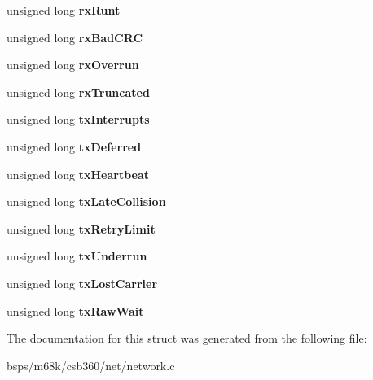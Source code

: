 \begin{DoxyCompactItemize}
unsigned long {\bfseries rx\+Runt}
\item 
\mbox{\label{structmcf5272__enet__struct_af6495160f0e4f48ba11eeb175e3903ad}} 
unsigned long {\bfseries rx\+Bad\+C\+RC}
\item 
\mbox{\label{structmcf5272__enet__struct_ac1e9f1dff85f63d8b0e8ae58a9b5f26c}} 
unsigned long {\bfseries rx\+Overrun}
\item 
\mbox{\label{structmcf5272__enet__struct_a6148a0d2e2bf0a9ecab4162e023cb716}} 
unsigned long {\bfseries rx\+Truncated}
\item 
\mbox{\label{structmcf5272__enet__struct_abbe9c5e93bb79d30a230dab62d350405}} 
unsigned long {\bfseries tx\+Interrupts}
\item 
\mbox{\label{structmcf5272__enet__struct_a08d0eae6b948e25a70125f64b32f203e}} 
unsigned long {\bfseries tx\+Deferred}
\item 
\mbox{\label{structmcf5272__enet__struct_aaf2ae753f3d40e3aca480bc3c8da214d}} 
unsigned long {\bfseries tx\+Heartbeat}
\item 
\mbox{\label{structmcf5272__enet__struct_adf2740ab6611525c79e3eda8efbd96b1}} 
unsigned long {\bfseries tx\+Late\+Collision}
\item 
\mbox{\label{structmcf5272__enet__struct_a5c5410eafd38d4e2f223a1b073192df3}} 
unsigned long {\bfseries tx\+Retry\+Limit}
\item 
\mbox{\label{structmcf5272__enet__struct_a48af5ad6eb07984e5e2d6e28729e4e69}} 
unsigned long {\bfseries tx\+Underrun}
\item 
\mbox{\label{structmcf5272__enet__struct_a8fa1e37e6510a970ff3e86894b028d93}} 
unsigned long {\bfseries tx\+Lost\+Carrier}
\item 
\mbox{\label{structmcf5272__enet__struct_a7a5be6bc9adff4805a9792fe681927a8}} 
unsigned long {\bfseries tx\+Raw\+Wait}
\end{DoxyCompactItemize}


The documentation for this struct was generated from the following file\+:\begin{DoxyCompactItemize}
\item 
bsps/m68k/csb360/net/network.\+c\end{DoxyCompactItemize}
